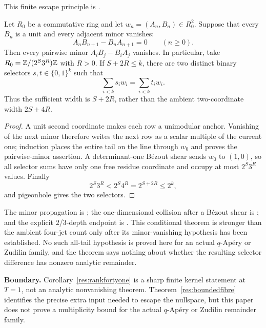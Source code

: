 \documentclass[11pt]{article}
\begin{document}
\noindent This finite escape principle is
.

\begin{theorem}
\label{res:plucker-collapse}
Let $R_0$ be a commutative ring and let $w_n=(A_n,B_n)\in R_0^2$.  Suppose
that every $B_n$ is a unit and every adjacent minor vanishes:
\[
 A_nB_{n+1}-B_nA_{n+1}=0\qquad(n\ge0).
\]
Then every pairwise minor $A_iB_j-B_iA_j$ vanishes.  In particular, take
$R_0=\mathbb{Z}/(2^S3^R)\mathbb{Z}$ with $R>0$.  If $S+2R\le k$, there are two distinct
binary selectors $s,t\in\{0,1\}^{k}$ such that
\[
 \sum_{i<k}s_iw_i=\sum_{i<k}t_iw_i.
\]
Thus the sufficient width is $S+2R$, rather than the ambient two-coordinate
width $2S+4R$.
\end{theorem}

\begin{proof}
A unit second coordinate makes each row a unimodular anchor.  Vanishing of the
next minor therefore writes the next row as a scalar multiple of the current
one; induction places the entire tail on the line through $w_0$ and proves the
pairwise-minor assertion.  A determinant-one B\'ezout shear sends $w_0$ to
$(1,0)$, so all selector sums have only one free residue coordinate and occupy
at most $2^S3^R$ values.  Finally
\[
 2^S3^R<2^S4^R=2^{S+2R}\le2^k,
\]
and pigeonhole gives the two selectors.
\end{proof}

\noindent The minor propagation is
;
the one-dimensional collision after a B\'ezout shear is
;
and the explicit $2$/$3$-depth endpoint is
.
This conditional theorem is stronger than the ambient four-jet count only
after its minor-vanishing hypothesis has been established.  No such all-tail
hypothesis is proved here for an actual $q$-Ap\'ery or Zudilin family, and the
theorem says nothing about whether the resulting selector difference has
nonzero analytic remainder.

\noindent\textbf{Boundary.}
Corollary~\ref{res:rankfortyone} is a sharp finite kernel statement at
$T=1$, not an analytic nonvanishing theorem.  Theorem~\ref{res:boundedfibre}
identifies the precise extra input needed to escape the nullspace, but this
paper does not prove a multiplicity bound for the actual $q$-Ap\'ery or
Zudilin remainder family.
\end{document}
